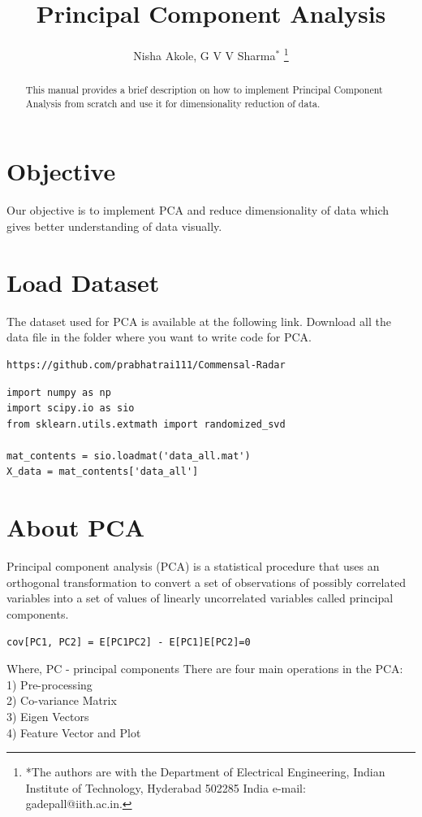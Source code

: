 \documentclass[journal,12pt,twocolumn]{IEEEtran}
\begin{document}
 \title{ Principal Component Analysis}
 
 \author{Nisha Akole, G V V 
Sharma$^{*}$%
\thanks{*The authors are with the Department
of Electrical Engineering, Indian Institute of Technology, Hyderabad
502285 India e-mail:  gadepall@iith.ac.in.}
}
\maketitle

\tableofcontents

\bigskip

\begin{abstract}
This manual provides a brief description on how to implement Principal Component Analysis from scratch and use it for dimensionality reduction of data.
\end{abstract}

\IEEEpeerreviewmaketitle

\section{Objective}
Our objective is to implement PCA and reduce dimensionality of data which gives better understanding of data visually.

\section{Load Dataset}
The dataset used for PCA is available at the following link. Download all the data file in the folder where you want to write code for PCA.
\begin{lstlisting}
https://github.com/prabhatrai111/Commensal-Radar
\end{lstlisting}
\begin{lstlisting}
import numpy as np
import scipy.io as sio
from sklearn.utils.extmath import randomized_svd

mat_contents = sio.loadmat('data_all.mat')
X_data = mat_contents['data_all']
\end{lstlisting}

\section{About PCA}
Principal component analysis (PCA) is a statistical procedure that uses an orthogonal transformation to convert a set of observations of possibly correlated variables into a set of values of linearly uncorrelated variables called principal components.
\begin{lstlisting}
cov[PC1, PC2] = E[PC1PC2] - E[PC1]E[PC2]=0
\end{lstlisting}
Where, PC - principal components
There are four main operations in the PCA:\\
		1) Pre-processing\\
		2) Co-variance Matrix\\
		3) Eigen Vectors\\
		4) Feature Vector and Plot
\end{document}
